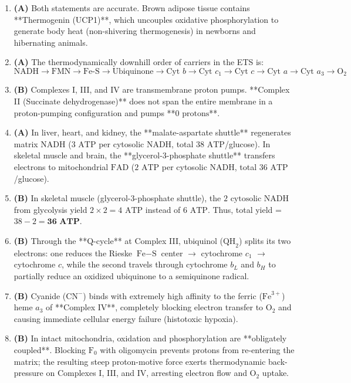 \documentclass[11pt, a4paper]{article}
\begin{document}
\begin{enumerate}[label=\textbf{\arabic*.}]
\item \textbf{(A)} Both statements are accurate. Brown adipose tissue contains **Thermogenin (UCP1)**, which uncouples oxidative phosphorylation to generate body heat (non-shivering thermogenesis) in newborns and hibernating animals.

\item \textbf{(A)} The thermodynamically downhill order of carriers in the ETS is:
$$\text{NADH} \rightarrow \text{FMN} \rightarrow \text{Fe-S} \rightarrow \text{Ubiquinone} \rightarrow \text{Cyt } b \rightarrow \text{Cyt } c_1 \rightarrow \text{Cyt } c \rightarrow \text{Cyt } a \rightarrow \text{Cyt } a_3 \rightarrow \text{O}_2$$

\item \textbf{(B)} Complexes I, III, and IV are transmembrane proton pumps. **Complex II (Succinate dehydrogenase)** does not span the entire membrane in a proton-pumping configuration and pumps **$0\text{ protons}$**.

\item \textbf{(A)} In liver, heart, and kidney, the **malate-aspartate shuttle** regenerates matrix $\text{NADH}$ ($3\text{ ATP}$ per cytosolic $\text{NADH}$, total $38\text{ ATP}$/glucose). In skeletal muscle and brain, the **glycerol-3-phosphate shuttle** transfers electrons to mitochondrial $\text{FAD}$ ($2\text{ ATP}$ per cytosolic $\text{NADH}$, total $36\text{ ATP}$/glucose).

\item \textbf{(B)} In skeletal muscle (glycerol-3-phosphate shuttle), the $2\text{ cytosolic NADH}$ from glycolysis yield $2 \times 2 = 4\text{ ATP}$ instead of $6\text{ ATP}$. Thus, total yield = $38 - 2 = \mathbf{36\text{ ATP}}$.

\item \textbf{(B)} Through the **Q-cycle** at Complex III, ubiquinol ($\text{QH}_2$) splits its two electrons: one reduces the Rieske $\text{Fe}-\text{S}$ center $\rightarrow$ cytochrome $c_1$ $\rightarrow$ cytochrome $c$, while the second travels through cytochrome $b_L$ and $b_H$ to partially reduce an oxidized ubiquinone to a semiquinone radical.

\item \textbf{(B)} Cyanide ($\text{CN}^-$) binds with extremely high affinity to the ferric ($\text{Fe}^{3+}$) heme $a_3$ of **Complex IV**, completely blocking electron transfer to $\text{O}_2$ and causing immediate cellular energy failure (histotoxic hypoxia).

\item \textbf{(B)} In intact mitochondria, oxidation and phosphorylation are **obligately coupled**. Blocking $\text{F}_0$ with oligomycin prevents protons from re-entering the matrix; the resulting steep proton-motive force exerts thermodynamic back-pressure on Complexes I, III, and IV, arresting electron flow and $\text{O}_2$ uptake.


\end{enumerate}
\end{document}
